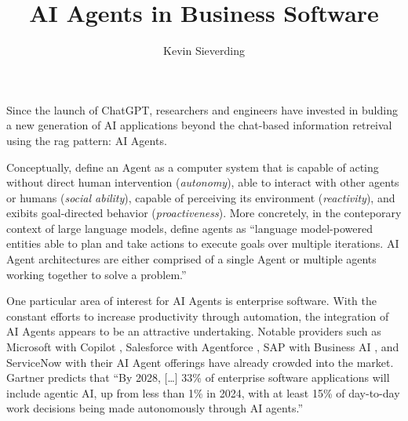 \documentclass[
  paper=a4,
  parskip=half,
  fontsize=12pt,
  listof=toc,
  titlepage,
  headsepline,
  footsepline,
]{scrartcl}
\author{Kevin Sieverding}
\title{AI Agents in Business Software}
\begin{document}

\maketitle

\clearpage

\addtocounter{frontpagecount}{\value{page}}

\clearpage



\pagestyle{scrheadings}

\setcounter{page}{1}


Since the launch of ChatGPT, researchers and engineers have invested in bulding a new generation of AI applications beyond the chat-based information retreival using the \gls{rag} pattern: AI Agents.
\parencite{mastermanLandscapeEmergingAI2024}

Conceptually, \cite{wooldridgeIntelligentAgentsTheory1995} define an Agent as a computer system that is capable of acting without direct human intervention (\textit{autonomy}), able to interact with other agents or humans (\textit{social ability}), capable of perceiving its environment (\textit{reactivity}), and exibits goal-directed behavior (\textit{proactiveness}).
More concretely, in the conteporary context of large language models, \cite{mastermanLandscapeEmergingAI2024} define agents as \enquote{language model-powered entities able to plan and take actions to execute goals over multiple iterations. AI Agent architectures are either comprised of a single Agent or multiple agents working together to solve a problem.}

One particular area of interest for AI Agents is enterprise software.
With the constant efforts to increase productivity through automation, the integration of AI Agents appears to be an attractive undertaking.
Notable providers such as Microsoft with Copilot \parencite{microsoftMicrosoftCopilotYour}, Salesforce with Agentforce \parencite{salesforceinc.AgentforceCreatePowerful}, SAP with Business AI \parencite{sapseSAPBusinessAI}, and ServiceNow with their AI Agent offerings \parencite{servicenowAIAgents} have already crowded into the market.
Gartner predicts that 
\enquote{By 2028, [\ldots] 33\% of enterprise software applications will include agentic AI, up from less than 1\% in 2024, with at least 15\% of day-to-day work decisions being made autonomously through AI agents.} \parencite{gartnerinc.HowImplementAI2025}
\end{document}
